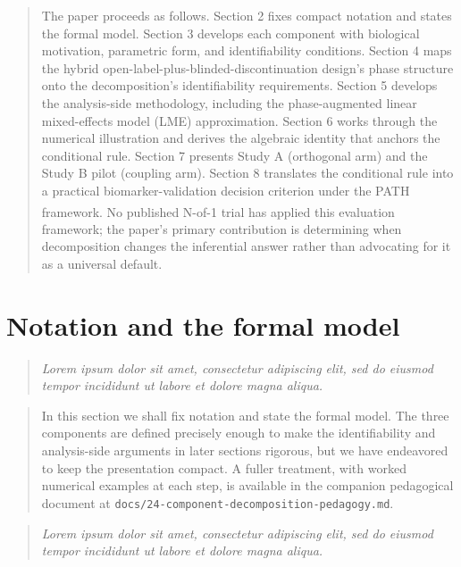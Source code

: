 \documentclass[
  11pt,
]{article}
\newenvironment{rgt}{%
  \begin{quote}\small\itshape\color[RGB]{20,60,160}}{%
  \end{quote}}
\newenvironment{orig}{%
  \begin{quote}\normalsize\color[gray]{0.55}}{%
  \end{quote}}
\begin{document}
\begin{orig}
The paper proceeds as follows. Section 2 fixes compact notation
and states the formal model. Section 3 develops each component
with biological motivation, parametric form, and identifiability
conditions. Section 4 maps the hybrid
open-label-plus-blinded-discontinuation design's phase structure
onto the decomposition's identifiability requirements. Section 5
develops the analysis-side methodology, including the
phase-augmented linear mixed-effects model (LME) approximation. Section 6 works through the
numerical illustration and derives the algebraic identity that
anchors the conditional rule. Section 7 presents Study A
(orthogonal arm) and the Study B pilot (coupling arm). Section 8
translates the conditional rule into a practical
biomarker-validation decision criterion under the PATH framework\textsuperscript{}. No published N-of-1 trial has applied this
evaluation framework; the paper's primary contribution is
determining when decomposition changes the inferential answer
rather than advocating for it as a universal default.

\end{orig}

\section{Notation and the formal model}\label{notation-and-the-formal-model}

\begin{rgt}
Lorem ipsum dolor sit amet, consectetur adipiscing elit, sed do eiusmod tempor incididunt ut labore et dolore magna aliqua.

\end{rgt}

\begin{orig}
In this section we shall fix notation and state the formal
model. The three components are defined precisely enough to make
the identifiability and analysis-side arguments in later
sections rigorous, but we have endeavored to keep the
presentation compact. A fuller treatment, with worked numerical
examples at each step, is available in the companion pedagogical
document at \texttt{docs/24-component-decomposition-pedagogy.md}.

\end{orig}

\begin{rgt}
Lorem ipsum dolor sit amet, consectetur adipiscing elit, sed do eiusmod tempor incididunt ut labore et dolore magna aliqua.

\end{rgt}
\end{document}
